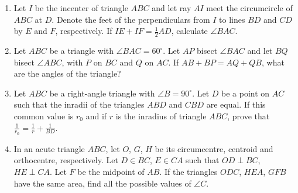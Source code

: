 \documentclass[12pt]{scrartcl}
\begin{document}
\begin{enumerate}
    \item Let $I$ be the incenter of triangle $ABC$ and let ray $AI$ meet the circumcircle of $ABC$ at $D$. Denote the feet of the perpendiculars from $I$ to lines $BD$ and $CD$ by $E$ and $F$, respectively. If $IE + IF = \frac{1}{2} AD$, calculate $\angle BAC$.

    \item Let $ABC$ be a triangle with $\angle BAC = 60^\circ$. Let $AP$ bisect $\angle BAC$ and let $BQ$ bisect $\angle ABC$, with $P$ on $BC$ and $Q$ on $AC$. If $AB + BP = AQ + QB$, what are the angles of the triangle?


    \item Let $ABC$ be a right-angle triangle with $\angle B = 90^\circ$. Let $D$ be a point on $AC$ such that the inradii of the triangles $ABD$ and $CBD$ are equal. If this common value is $r_0$ and if $r$ is the inradius of triangle $ABC$, prove that $\frac{1}{r_0} = \frac{1}{r} + \frac{1}{BD}$.


    \item In an acute triangle $ABC$, let $O$, $G$, $H$ be its circumcentre, centroid and orthocentre, respectively. Let $D \in BC$, $E \in CA$ such that $OD \perp BC$, $HE \perp CA$. Let $F$ be the midpoint of $AB$. If the triangles $ODC$, $HEA$, $GFB$ have the same area, find all the possible values of $\angle C$.

\end{enumerate}
\end{document}
